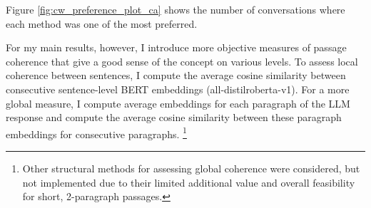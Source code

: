 \documentclass[11pt]{article}
\begin{document}
Figure \ref{fig:cw_preference_plot_ca} shows the number of conversations where each method was one of the most preferred.

For my main results, however, I introduce more objective measures of passage coherence that give a good sense of the concept on various levels. To assess local coherence between sentences, I compute the average cosine similarity between consecutive sentence-level BERT embeddings (all-distilroberta-v1). For a more global measure, I compute average embeddings for each paragraph of the LLM response and compute the average cosine similarity between these paragraph embeddings for consecutive paragraphs. \footnote{Other structural methods for assessing global coherence were considered, but not implemented due to their limited additional value and overall feasibility for short, 2-paragraph passages.}

\end{document}
